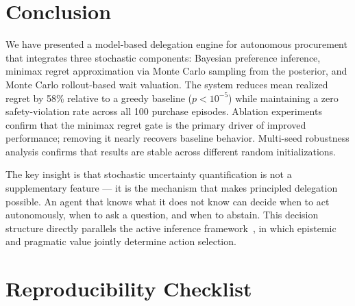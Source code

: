 \documentclass[11pt,letterpaper]{article}
\begin{document}
\section{Conclusion}
\label{sec:conclusion}

We have presented a model-based delegation engine for autonomous procurement that integrates three stochastic components: Bayesian preference inference, minimax regret approximation via Monte Carlo sampling from the posterior, and Monte Carlo rollout-based wait valuation.  The system reduces mean realized regret by 58\% relative to a greedy baseline ($p < 10^{-5}$) while maintaining a zero safety-violation rate across all 100 purchase episodes.  Ablation experiments confirm that the minimax regret gate is the primary driver of improved performance; removing it nearly recovers baseline behavior.  Multi-seed robustness analysis confirms that results are stable across different random initializations.

The key insight is that stochastic uncertainty quantification is not a supplementary feature --- it is the mechanism that makes principled delegation possible.  An agent that knows what it does not know can decide when to act autonomously, when to ask a question, and when to abstain.  This decision structure directly parallels the active inference framework~\citep{bogacz2017tutorial,smith2022active}, in which epistemic and pragmatic value jointly determine action selection.




\appendix
\section{Reproducibility Checklist}
\label{app:repro}
\end{document}
